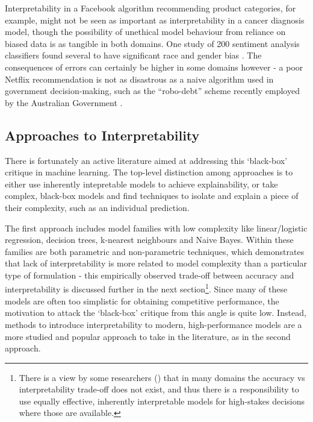 \documentclass[main]{subfiles}
\begin{document}
Interpretability in a Facebook algorithm recommending product categories, for example, might not be seen as important as interpretability in a cancer diagnosis model, though the possibility of unethical model behaviour from reliance on biased data is as tangible in both domains. One study of 200 sentiment analysis classifiers found several to have significant race and gender bias \cite{bias}. The consequences of errors can certainly be higher in some domains however - a poor Netflix recommendation is not as disastrous as a naive algorithm used in government decision-making, such as the ``robo-debt'' scheme recently employed by the Australian Government \cite{nous}.

\subsection*{Approaches to Interpretability}

There is fortunately an active literature aimed at addressing this `black-box' critique in machine learning. The top-level distinction among approaches is to either use inherently intepretable models to achieve explainability, or take complex, black-box models and find techniques to isolate and explain a piece of their complexity, such as an individual prediction.

The first approach includes model families with low complexity like linear/logistic regression, decision trees, k-nearest neighbours and Naive Bayes. Within these families are both parametric and non-parametric techniques, which demonstrates that lack of interpretability is more related to model complexity than a particular type of formulation - this empirically observed trade-off between accuracy and interpretability is discussed further in the next section\footnote{There is a view by some researchers (\cite{rudin}) that in many domains the accuracy vs interpretability trade-off does not exist, and thus there is a responsibility to use equally effective, inherently interpretable models for high-stakes decisions where those are available.}. Since many of these models are often too simplistic for obtaining competitive performance, the motivation to attack the `black-box' critique from this angle is quite low. Instead, methods to introduce interpretability to modern, high-performance models are a more studied and popular approach to take in the literature, as in the second approach.
\end{document}
